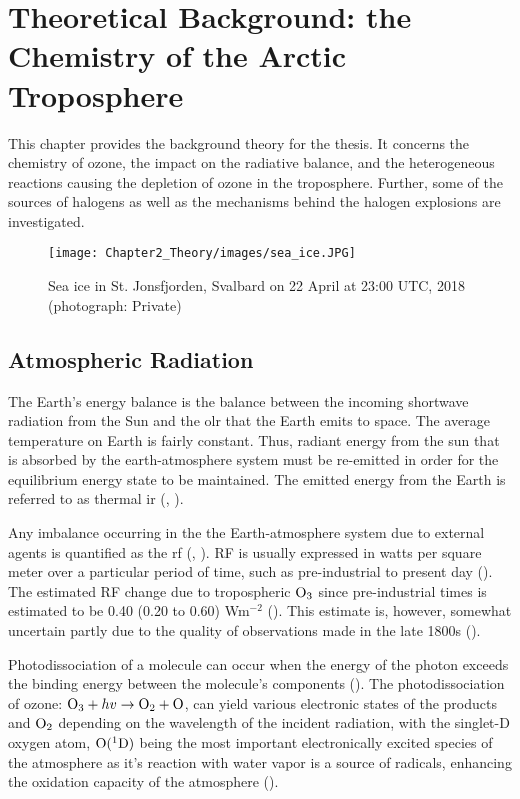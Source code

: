 \setcounter{chapter}{1} 
\chapter{Theoretical Background: the Chemistry of the Arctic Troposphere} \label{ch:theoretical_back}

This chapter provides the background theory for the thesis. It concerns the chemistry of ozone, the impact on the radiative balance, and the heterogeneous reactions causing the depletion of ozone in the troposphere. Further, some of the sources of halogens as well as the mechanisms behind the halogen explosions are investigated. 

\begin{figure}
    \centering
    \texttt{[image: Chapter2\_Theory/images/sea\_ice.JPG]}
    \caption{Sea ice in St. Jonsfjorden, Svalbard on 22 April at 23:00 UTC, 2018 (photograph: Private)}
    \label{fig:sea_ice}
\end{figure}


\section{Atmospheric Radiation}\label{sec:atm_rad}

The Earth's energy balance is the balance between the incoming shortwave radiation from the Sun and the \acrfull{olr} that the Earth emits to space. The average temperature on Earth is fairly constant. Thus, radiant energy from the sun that is absorbed by the earth-atmosphere system must be re-emitted in order for the equilibrium energy state to be maintained. The emitted energy from the Earth is referred to as thermal \acrfull{ir} (\cite{Liou_AtmRad}, \cite{SeinfeldSpyros}). 

\medskip

Any imbalance occurring in the the Earth-atmosphere system due to external agents is quantified as the \acrfull{rf} (\cite{IPCCchapter8}, \cite{Bowman2013}). RF is usually expressed in watts per square meter over a particular period of time, such as pre-industrial to present day (\cite{IPCCchapter8}). The estimated RF change due to tropospheric $\mathrm{O_3}$ since pre-industrial times is estimated to be 0.40 (0.20 to 0.60) Wm$^{-2}$ (\cite{IPCCchapter8}). This estimate is, however, somewhat uncertain partly due to the quality of observations made in the late 1800s (\cite{Tarasick2019}).


\medskip

Photodissociation of a molecule can occur when the energy of the photon exceeds the binding energy between the molecule's components (\cite{SeinfeldSpyros}). The photodissociation of ozone: $\mathrm{O_3} + hv \rightarrow \mathrm{O_2} + \mathrm{O}$, can yield various electronic states of the products  and $\mathrm{O_2}$ depending on the wavelength of the incident radiation, with the singlet-D oxygen atom, $\mathrm{O}(^1\mathrm{D})$ being the most important electronically excited species of the atmosphere as it's reaction with water vapor is a source of  radicals, enhancing the oxidation capacity of the atmosphere (\cite{SeinfeldSpyros}).


